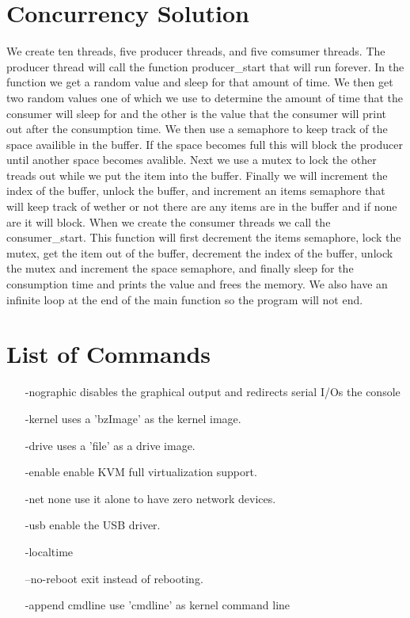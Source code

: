 \documentclass[letterpaper,10pt,titlepage]{article}
\begin{document}
\section{Concurrency Solution}
We create ten threads, five producer threads, and five comsumer threads. The
producer thread will call the function producer\_start that will run forever.
In the function we get a random value and sleep for that amount of time. We then
get two random values one of which we use to determine the amount of time that
the consumer will sleep for and the other is the value that the consumer will
print out after the consumption time. We then use a semaphore to keep track 
of the space availible in the buffer. If the space becomes full this will 
block the producer until another space becomes avalible. Next we use a mutex
to lock the other treads out while we put the item into the buffer. Finally we
will increment the index of the buffer, unlock the buffer, and increment an 
items semaphore that will keep track of wether or not there are any items are 
in the buffer and if none are it will block. When we create the consumer 
threads we call the consumer\_start. This function will first decrement the 
items semaphore, lock the mutex, get the item out of the buffer, decrement the 
index of the buffer, unlock the mutex and increment the space semaphore, and 
finally sleep for the consumption time and prints the value and frees the 
memory. We also have an infinite loop at the end of the main function so the 
program will not end.

\section{List of Commands}
\begin{enumerate}
   \item[-nographic] disables the graphical output and redirects serial I/Os the console
   \item[-kernel] uses a 'bzImage' as the kernel image.
   \item[-drive] uses a 'file' as a drive image.
   \item[-enable] enable KVM full virtualization support.
   \item[-net none] use it alone to have zero network devices.
   \item[-usb] enable the USB driver.
   \item[-localtime] 
   \item[--no-reboot] exit instead of rebooting.
   \item[-append] cmdline use 'cmdline' as kernel command line
\end{enumerate}
\end{document}
